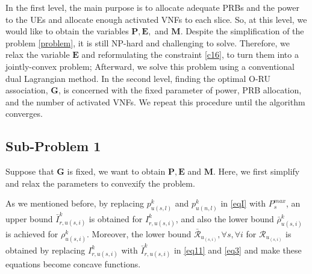 \documentclass[conference]{IEEEtran}
\begin{document}
In the first level, the main purpose is to allocate adequate PRBs and the power to the UEs and allocate enough activated VNFs
to each slice. So, at this level, we would like to obtain the variables $\boldsymbol{P}, \boldsymbol{E},$ and $\boldsymbol{M}$.
Despite the simplification of the problem
\eqref{problem}, it is still NP-hard and challenging to solve. Therefore,
we relax the variable $\boldsymbol{E}$ \cite{lee2018dynamic,ali2018joint} and reformulating the constraint \eqref{c16},
to turn them into a jointly-convex problem; Afterward, we solve this problem using a conventional dual Lagrangian method. 
In the second level, finding the optimal O-RU association, $ \boldsymbol{G}$, is concerned with the fixed parameter of power, PRB allocation, and the number of activated VNFs.   
We repeat this procedure until the algorithm converges.

\subsection{Sub-Problem 1}\label{sub1}
Suppose that $\boldsymbol{G}$ is fixed, we want to obtain $\boldsymbol{P}, \boldsymbol{E}$ and $\boldsymbol{M}$.
Here, we first simplify and relax the parameters to convexify the problem.

As we mentioned before, by replacing $p_{u(s,l)}^{k}$ and $p_{u(n,l)}^{k}$ in \eqref{eqI} with $P^{max}_s$, an upper bound $\bar{I}_{r,u(s,i)}^{k}$ is obtained for $I_{r,u(s,i)}^{k}$, and also the lower bound $\bar{\rho}_{u(s,i)}^{k}$ is achieved
for $\rho_{u(s,i)}^{k}$. 
Moreover, the lower bound $\bar{\mathcal{R}}_{u_{(s,i)}}, \forall s , \forall i$ for  ${\mathcal{R}}_{u_{(s,i)}}$ is obtained by replacing $I_{r,u(s,i)}^{k}$ with $\bar{I}_{r,u(s,i)}^{k}$ in \eqref{eq11} and \eqref{eq3} and make these equations become concave functions.
\end{document}
